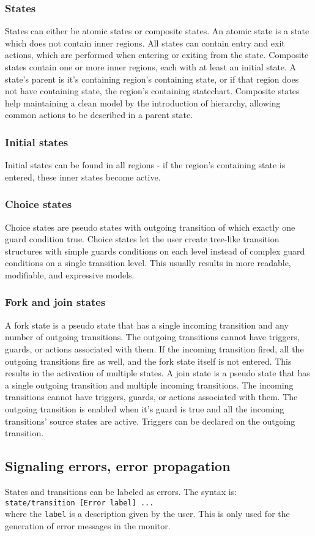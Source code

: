 \documentclass{book}
\begin{document}
{    \subsubsection{States}
States can either be atomic states or composite states. An atomic state is a state which does not contain inner regions. All states can contain entry and exit actions, which are performed when entering or exiting from the state. Composite states contain one or more inner regions, each with at least an initial state. A state's parent is it's containing region's containing state, or if that region does not have containing state, the region's containing statechart. Composite states help maintaining a clean model by the introduction of hierarchy, allowing common actions to be described in a parent state.
    \subsubsection{Initial states}
Initial states can be found in all regions - if the region's containing state is entered, these inner states become active.
    \subsubsection{Choice states}
Choice states are pseudo states with outgoing transition of which exactly one guard condition true. Choice states let the user create tree-like transition structures with simple guards conditions on each level instead of complex guard conditions on a single transition level. This usually results in more readable, modifiable, and expressive models.
    \subsubsection{Fork and join states}
A fork state is a pseudo state that has a single incoming transition and any number of outgoing transitions. The outgoing transitions cannot have triggers, guards, or actions associated with them. If the incoming transition fired, all the outgoing transitions fire as well, and the fork state itself is not entered. This results in the activation of multiple states.
A join state is a pseudo state that has a single outgoing transition and multiple incoming transitions. The incoming transitions cannot have triggers, guards, or actions associated with them. The outgoing transition is enabled when it's guard is true and all the incoming transitions' source states are active. Triggers can be declared on the outgoing transition.
  \subsection{Signaling errors, error propagation}
States and transitions can be labeled as errors. The syntax is: \\\verb!state/transition [Error label] ...!\\ where the \verb!label! is a description given by the user. This is only used for the generation of error messages in the monitor.
}
\end{document}
